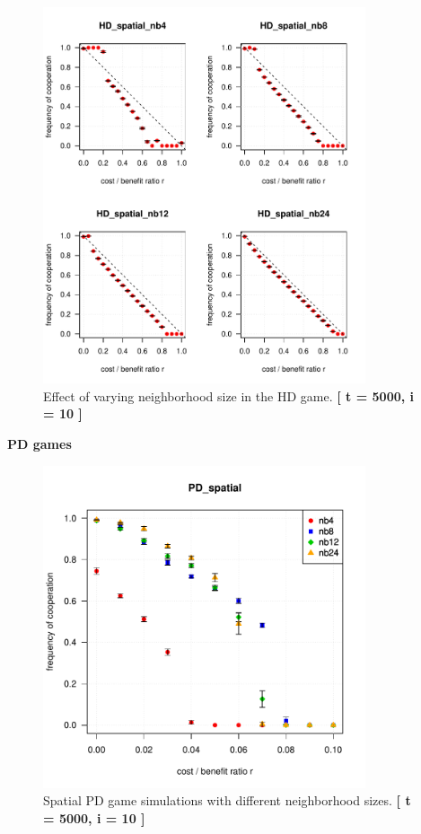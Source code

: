 \begin{figure}[H]
	\centering 
	\includegraphics[width=9.5cm]{task2_4plot}
	\caption{Effect of varying neighborhood size in the HD game.  \textbf{[ t = 5000, i = 10 ]} }\label{fig: task2_4plot}
\end{figure}



\textbf{PD games} 


\begin{figure}[H]
	\centering 
	\includegraphics[width=9.5cm]{task2_multiplot}
	\caption{Spatial PD game simulations with different neighborhood sizes.  \textbf{[ t = 5000, i = 10 ]} }\label{fig: task2_multiplot}
\end{figure}



